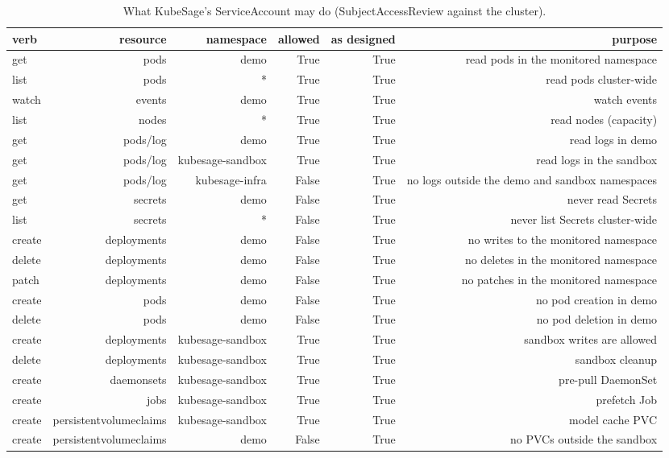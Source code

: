 \begin{table}[t]
\centering\small
\caption{What KubeSage's ServiceAccount may do (SubjectAccessReview against the cluster).}\label{tab:rq4_authz}
\begin{tabular}{lrrrrr}
\toprule
verb & resource & namespace & allowed & as designed & purpose \\
\midrule
get & pods & demo & True & True & read pods in the monitored namespace \\
list & pods & * & True & True & read pods cluster-wide \\
watch & events & demo & True & True & watch events \\
list & nodes & * & True & True & read nodes (capacity) \\
get & pods/log & demo & True & True & read logs in demo \\
get & pods/log & kubesage-sandbox & True & True & read logs in the sandbox \\
get & pods/log & kubesage-infra & False & True & no logs outside the demo and sandbox namespaces \\
get & secrets & demo & False & True & never read Secrets \\
list & secrets & * & False & True & never list Secrets cluster-wide \\
create & deployments & demo & False & True & no writes to the monitored namespace \\
delete & deployments & demo & False & True & no deletes in the monitored namespace \\
patch & deployments & demo & False & True & no patches in the monitored namespace \\
create & pods & demo & False & True & no pod creation in demo \\
delete & pods & demo & False & True & no pod deletion in demo \\
create & deployments & kubesage-sandbox & True & True & sandbox writes are allowed \\
delete & deployments & kubesage-sandbox & True & True & sandbox cleanup \\
create & daemonsets & kubesage-sandbox & True & True & pre-pull DaemonSet \\
create & jobs & kubesage-sandbox & True & True & prefetch Job \\
create & persistentvolumeclaims & kubesage-sandbox & True & True & model cache PVC \\
create & persistentvolumeclaims & demo & False & True & no PVCs outside the sandbox \\

\end{tabular}
\end{table}
